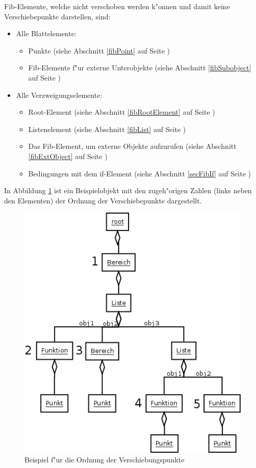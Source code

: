 \bigskip\noindent
Fib-Elemente, welche nicht verschoben werden k"onnen und damit keine Verschiebepunkte darstellen, sind:
\begin{itemize}
 \item Alle Blattelemente:
 \begin{itemize}
  \item Punkte (siehe Abschnitt \ref{fibPoint} auf Seite \pageref{fibPoint})
  \item Fib-Elemente f"ur externe Unterobjekte (siehe Abschnitt \ref{fibSubobject} auf Seite \pageref{fibSubobject})
 \end{itemize}
 \item Alle Verzweigungselemente:
 \begin{itemize}
  \item Root-Element (siehe Abschnitt \ref{fibRootElement} auf Seite \pageref{fibRootElement})
  \item Listenelement (siehe Abschnitt \ref{fibList} auf Seite \pageref{fibList})
  \item Das Fib-Element, um externe Objekte aufzurufen (siehe Abschnitt \ref{fibExtObject} auf Seite \pageref{fibExtObject})
  \item Bedingungen mit dem if-Element (siehe Abschnitt \ref{secFibIf} auf Seite \pageref{secFibIf})
 \end{itemize}
\end{itemize}

In Abbildung \ref{figOrderMovePoints} ist ein Beispielobjekt mit den zugeh"origen Zahlen (links neben den Elementen) der Ordnung der Verschiebepunkte dargestellt.

\begin{figure}[htbp]
\begin{center}
  \includegraphics[scale=0.5]{order_move_points}
\end{center}
\caption{Beispiel f"ur die Ordnung der Verschiebungspunkte}
\label{figOrderMovePoints}
\end{figure}


